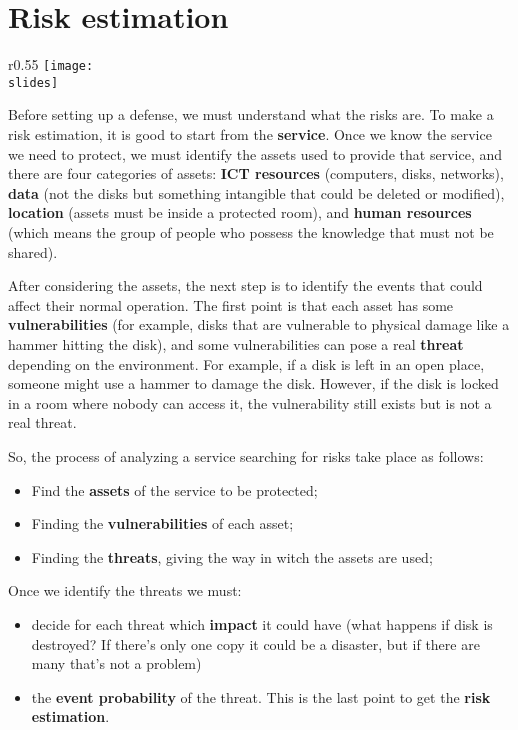 \section{Risk estimation}

\begin{wrapfigure}{r}{0.55\textwidth}
  \centering
  \texttt{[image: \\slides]}
\end{wrapfigure}

Before setting up a defense, we must understand what the risks are. To make a risk estimation, it is good to start from the \textbf{service}. Once we know the service we need to protect, we must identify the assets used to provide that service, and there are four categories of assets: \textbf{ICT resources} (computers, disks, networks), \textbf{data} (not the disks but something intangible that could be deleted or modified), \textbf{location} (assets must be inside a protected room), and \textbf{human resources} (which means the group of people who possess the knowledge that must not be shared).

After considering the assets, the next step is to identify the events that could affect their normal operation. The first point is that each asset has some \textbf{vulnerabilities} (for example, disks that are vulnerable to physical damage like a hammer hitting the disk), and some vulnerabilities can pose a real \textbf{threat} depending on the environment. For example, if a disk is left in an open place, someone might use a hammer to damage the disk. However, if the disk is locked in a room where nobody can access it, the vulnerability still exists but is not a real threat.

\vspace{5mm}
So, the process of analyzing a service searching for risks take place as follows:
\begin{itemize}
  \item Find the \textbf{assets} of the service to be protected;
  \item Finding the \textbf{vulnerabilities} of each asset;
  \item Finding the \textbf{threats}, giving the way in witch the assets are used;
\end{itemize}

\vspace{5mm}
Once we identify the threats we must:
\begin{itemize}
  \item decide for each threat which \textbf{impact} it could have (what happens if disk is destroyed? If there's only one copy it could be a disaster, but if there are many that's not a problem)
  \item the \textbf{event probability} of the threat. This is the last point to get the \textbf{risk estimation}.
\end{itemize}

